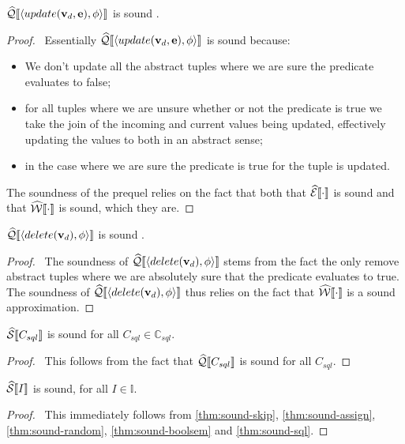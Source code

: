 \begin{conjecture}\label{thm:sound-update}
    $\widehat{\mathcal{Q}}\llbracket \langle update(\mathbf{v}_d, \mathbf{e}), \phi \rangle \rrbracket$ is sound .
\end{conjecture}
\begin{proof}
    \pfsketch\
    Essentially $\widehat{\mathcal{Q}}\llbracket \langle update(\mathbf{v}_d, \mathbf{e}), \phi \rangle \rrbracket$ is sound because:
    \begin{itemize}
        \item We don't update all the abstract tuples where we are sure the predicate evaluates to false;
        \item for all tuples where we are unsure whether or not the predicate is true we take the join of the incoming and current values being updated, effectively updating the values to both in an abstract sense;
        \item in the case where we are sure the predicate is true for the tuple is updated.
    \end{itemize}
    The soundness of the prequel relies on the fact that both that $\widehat{\mathcal{E}}\llbracket \cdot \rrbracket$ is sound and that $\widehat{\mathcal{W}}\llbracket \cdot \rrbracket$ is sound, which they are.
\end{proof}

\begin{conjecture}\label{thm:sound-update}
    $\widehat{\mathcal{Q}}\llbracket \langle delete(\mathbf{v}_d), \phi \rangle \rrbracket$ is sound .
\end{conjecture}
\begin{proof}
    \pfsketch\
    The soundness of $\widehat{\mathcal{Q}}\llbracket \langle delete(\mathbf{v}_d), \phi \rangle \rrbracket$ stems from the fact the only remove abstract tuples where we are absolutely sure that the predicate evaluates to true.
    The soundness of $\widehat{\mathcal{Q}}\llbracket \langle delete(\mathbf{v}_d), \phi \rangle \rrbracket$ thus relies on the fact that $\widehat{\mathcal{W}}\llbracket \cdot \rrbracket$ is a sound approximation.
\end{proof}

\begin{conjecture}\label{thm:sound-sql}
    $\widehat{\mathcal{S}} \llbracket C_{sql} \rrbracket$ is sound for all $C_{sql} \in \mathbb{C}_{sql}$.
\end{conjecture}
\begin{proof}
    \pf\
    This follows from the fact that $\widehat{\mathcal{Q}}\llbracket C_{sql} \rrbracket$ is sound for all $C_{sql}$.
\end{proof}

\begin{conjecture}
    $\widehat{\mathcal{S}} \llbracket I \rrbracket$ is sound, for all $I \in \mathbb{I}$.
\end{conjecture}
\begin{proof}
    \pf\
    This immediately follows from \autoref{thm:sound-skip}, \ref{thm:sound-assign}, \ref{thm:sound-random}, \ref{thm:sound-boolsem} and \ref{thm:sound-sql}.
\end{proof}

